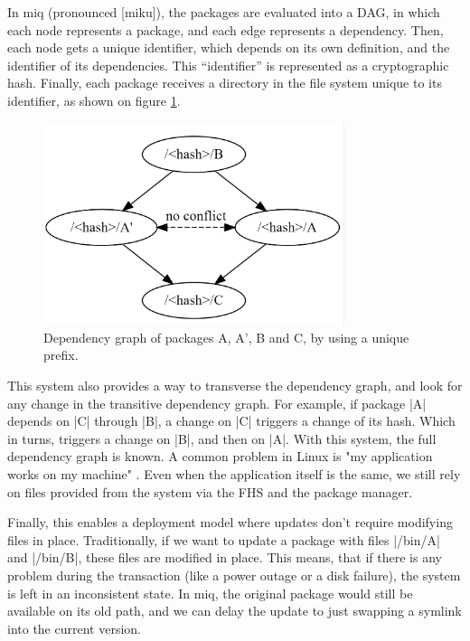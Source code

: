 In miq (pronounced [miku]), the packages are evaluated into a \ac{DAG}, in which
each node represents a package, and each edge represents a dependency. Then,
each node gets a unique identifier, which depends on its own definition, and the
identifier of its dependencies. This ``identifier'' is represented as a
cryptographic hash. Finally, each package receives a
directory in the file system
unique to its identifier, as shown on figure \ref{fig:graph4}.


\begin{figure}
    \centering
    \includegraphics[width=250pt]{Screenshot 2023-05-29 164148.png}
    \caption{Dependency graph of packages A, A', B and C, by using a unique prefix.}
    \label{fig:graph4}
\end{figure}



This system also provides a way to transverse the dependency graph, and look for
any change in the transitive dependency graph. For example, if package |A|
depends on |C| through |B|, a change on |C| triggers a change of its hash. Which
in turns, triggers a change on |B|, and then on |A|. With this system, the full
dependency graph is known. A common problem in Linux is "my application works on
my machine" \cite{mukherjeeFixingDependencyErrors2021}. Even when the application itself is the same, we still rely on
files provided from the system via the \ac{FHS} and the package manager.

Finally, this enables a deployment model where updates don't require modifying
files in place. Traditionally, if we want to update a package with files
|/bin/A| and |/bin/B|, these files are modified in place. This means, that if
there is any problem during the transaction (like a power outage or a disk
failure), the system is left in an inconsistent state. In miq, the original
package would still be available on its old path, and we can delay the update to
just swapping a symlink into the current version.

